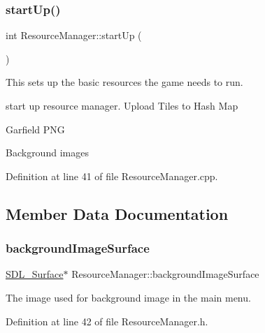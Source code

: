 \mbox{\label{class_resource_manager_a53bf358b029e050a285725bc70a8550a}} 
\subsubsection{\texorpdfstring{startUp()}{startUp()}}
{\footnotesize\ttfamily int Resource\+Manager\+::start\+Up (\begin{DoxyParamCaption}{ }\end{DoxyParamCaption})}



This sets up the basic resources the game needs to run. 

start up resource manager. Upload Tiles to Hash Map

Garfield P\+NG

Background images 

Definition at line 41 of file Resource\+Manager.\+cpp.



\subsection{Member Data Documentation}
\mbox{\label{class_resource_manager_a838f1019a12db7404424df66f9bad362}} 
\subsubsection{\texorpdfstring{backgroundImageSurface}{backgroundImageSurface}}
{\footnotesize\ttfamily \mbox{\hyperlink{struct_s_d_l___surface}{S\+D\+L\+\_\+\+Surface}}$\ast$ Resource\+Manager\+::background\+Image\+Surface}



The image used for background image in the main menu. 



Definition at line 42 of file Resource\+Manager.\+h.

\mbox{\label{class_resource_manager_a33a1a84148c7ae43ac20894c59f52ebf}} 
